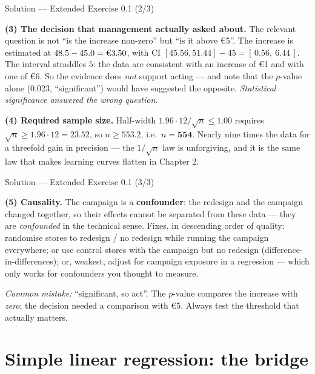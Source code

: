 \documentclass[aspectratio=169,11pt]{beamer}
\begin{document}
\begin{frame}{Solution --- Extended Exercise 0.1 (2/3)}
  \begin{solutionbox}
    \textbf{(3) The decision that management actually asked about.}
    The relevant question is not ``is the increase non-zero'' but ``is it
    above \euro 5''. The increase is estimated at
    $48.5 - 45.0 = \text{\euro} 3.50$, with CI
    $[45.56, 51.44] - 45 = [\,0.56,\ 6.44\,]$. The interval straddles $5$:
    the data are consistent with an increase of \euro 1 and with one of
    \euro 6. So the evidence does \emph{not} support acting --- and note that
    the $p$-value alone ($0.023$, ``significant'') would have suggested the
    opposite. \emph{Statistical significance answered the wrong question.}

    \textbf{(4) Required sample size.} Half-width
    $1.96 \cdot 12/\sqrt{n} \le 1.00$ requires
    $\sqrt n \ge 1.96 \cdot 12 = 23.52$, so $n \ge 553.2$, i.e.\
    $n = \textbf{554}$. Nearly nine times the data for a threefold gain in
    precision --- the $1/\sqrt{n}$ law is unforgiving, and it is the same law
    that makes learning curves flatten in Chapter 2.
  \end{solutionbox}
\end{frame}

\begin{frame}{Solution --- Extended Exercise 0.1 (3/3)}
  \begin{solutionbox}
    \textbf{(5) Causality.} The campaign is a \textbf{confounder}: the
    redesign and the campaign changed together, so their effects cannot be
    separated from these data --- they are \emph{confounded} in the technical
    sense. Fixes, in descending order of quality: randomise stores to
    redesign / no redesign while running the campaign everywhere; or use
    control stores with the campaign but no redesign (difference-in-differences);
    or, weakest, adjust for campaign exposure in a regression --- which only
    works for confounders you thought to measure.

    \smallskip
    \textit{Common mistake:} ``significant, so act''. The $p$-value compares
    the increase with \emph{zero}; the decision needed a comparison with
    \euro 5. Always test the threshold that actually matters.
  \end{solutionbox}
\end{frame}


\section[Simple regression]{Simple linear regression: the bridge}
\end{document}
